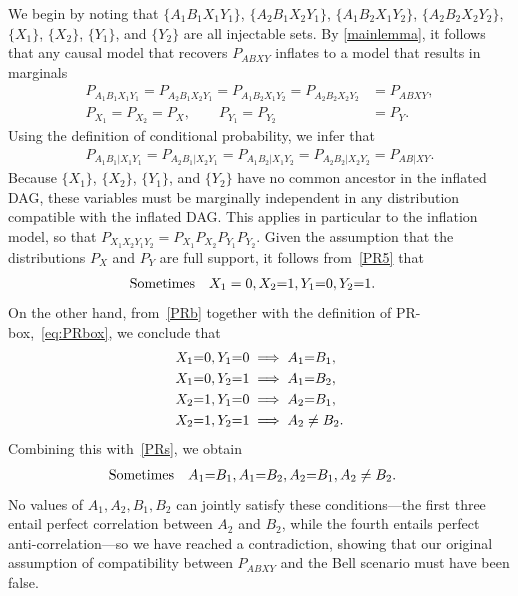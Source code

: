 We begin by noting that $\{A_1 B_1 X_1 Y_1\}$, $\{A_2 B_1 X_2 Y_1\}$, $\{A_1 B_2 X_1 Y_2\}$, $\{A_2 B_2 X_2 Y_2\}$, $\{X_1\}$, $\{X_2\}$, $\{Y_1\}$, and $\{Y_2\}$ are all injectable sets. 
By \cref{mainlemma}, it follows that any causal model that recovers $P_{ABXY}$ inflates to a model that results in marginals
\begin{align}
P_{A_1 B_1 X_1 Y_1}=P_{A_2 B_1 X_2 Y_1}=P_{A_1 B_2 X_1 Y_2}=P_{A_2 B_2 X_2 Y_2}&=P_{A B X Y},\label{PR1}\\
P_{X_1}=P_{X_2}=P_X, \qquad P_{Y_1}=P_{Y_2}&=P_Y.\label{PR5}
\end{align}
Using the definition of conditional probability, we infer that
\begin{align}
P_{A_1 B_1 |X_1 Y_1}=P_{A_2 B_1 |X_2 Y_1}=P_{A_1 B_2 |X_1 Y_2}=P_{A_2 B_2 |X_2 Y_2}=P_{A B |X Y}\label{PRb}.
\end{align}
Because $\{X_1\}$, $\{X_2\}$, $\{Y_1\}$, and $\{Y_2\}$ have no common ancestor in the inflated DAG, these variables must be marginally independent in any distribution compatible with the inflated DAG. This applies in particular to the inflation model, so that $P_{X_1 X_2 Y_1 Y_2} = P_{X_1} P_{X_2} P_{Y_1} P_{Y_2}$. Given the assumption that the distributions $P_{X}$ and $P_{Y}$ are full support, it follows from~\cref{PR5} that
\begin{align}\label{PRs}
\text{Sometimes} \quad &X_1 = 0, X_2 \mathord{=}1, Y_1 \mathord{=} 0, Y_2 \mathord{=} 1.
\end{align} 
On the other hand, from~\cref{PRb} together with  the definition of PR-box,~\cref{eq:PRbox}, we conclude that 
\begin{align} 
\begin{split}
\label{PRsi}
&X_1 \mathord{=} 0, Y_1 \mathord{=} 0 \implies A_1\mathord{=} B_1,\\
&X_1 \mathord{=} 0, Y_2 \mathord{=} 1 \implies A_1\mathord{=} B_2,\\
&X_2 \mathord{=} 1, Y_1 \mathord{=} 0 \implies A_2\mathord{=} B_1,\\
&X_2 \mathord{=} 1, Y_2 \mathord{=} 1 \implies A_2\ne B_2.
\end{split}
\end{align}
Combining this with~\cref{PRs}, we obtain
\begin{align}
\text{Sometimes} \quad &A_1\mathord{=} B_1, A_1\mathord{=} B_2, A_2\mathord{=} B_1, A_2\ne B_2.
\end{align} 
No values of $A_1, A_2, B_1, B_2$ can jointly satisfy these conditions---the first three entail perfect correlation between $A_2$ and $B_2$, while the fourth entails perfect anti-correlation---so we have reached a contradiction, showing that our original assumption of compatibility between $P_{ABXY}$ and the Bell scenario must have been false.

